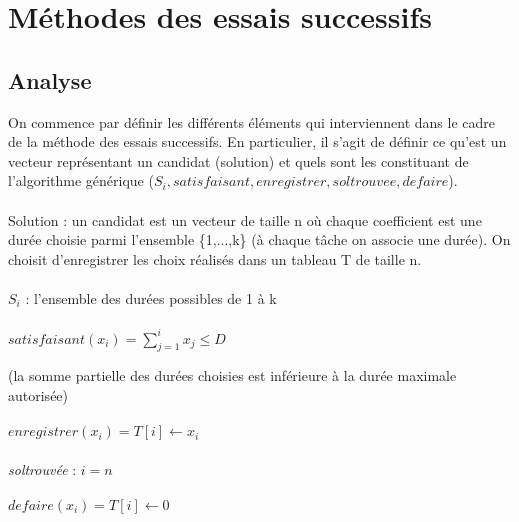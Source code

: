 \documentclass[a4paper, titlepage]{article}
\begin{document}
\section{Méthodes des essais successifs}

	\subsection{Analyse}

		On commence par définir les différents éléments qui interviennent dans le cadre de la méthode des essais successifs.
		En particulier, il s'agit de définir ce qu'est un vecteur représentant un candidat (solution) et quels sont les constituant de l'algorithme générique ($S_{i}, satisfaisant, enregistrer, soltrouvee, defaire$).

		\paragraph{}\noindent
		Solution : un candidat est un vecteur de taille n où chaque coefficient est une durée choisie parmi l'ensemble \{1,...,k\} (à chaque tâche on associe une durée).
		On choisit d'enregistrer les choix réalisés dans un tableau T de taille n.

		\paragraph{}\noindent
		$S_{i}$ : l'ensemble des durées possibles de 1 à k

		\paragraph{}\noindent
		$satisfaisant(x_{i}) = \sum_{j=1}^{i} x_{j} \le D$

		(la somme partielle des durées choisies est inférieure à la durée maximale autorisée)

		\paragraph{}\noindent
		$enregistrer(x_{i}) = T[i] \leftarrow x_{i}$

		\paragraph{}\noindent
		\emph{soltrouvée} : $i = n$

		\paragraph{}\noindent
		$defaire(x_{i}) = T[i] \leftarrow 0$
\end{document}
